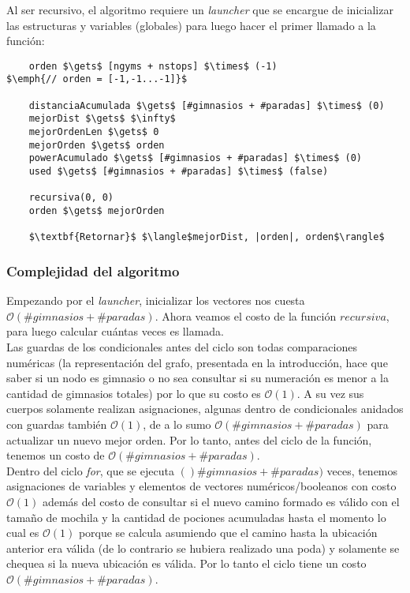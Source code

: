     Al ser recursivo, el algoritmo requiere un \emph{launcher} que se encargue de inicializar las estructuras y variables (globales) para luego hacer el primer llamado a la función:

    \begin{lstlisting}
    orden $\gets$ [ngyms + nstops] $\times$ (-1)                $\emph{// orden = [-1,-1...-1]}$

    distanciaAcumulada $\gets$ [#gimnasios + #paradas] $\times$ (0)
    mejorDist $\gets$ $\infty$
    mejorOrdenLen $\gets$ 0
    mejorOrden $\gets$ orden
    powerAcumulado $\gets$ [#gimnasios + #paradas] $\times$ (0)
    used $\gets$ [#gimnasios + #paradas] $\times$ (false)

    recursiva(0, 0)
    orden $\gets$ mejorOrden

    $\textbf{Retornar}$ $\langle$mejorDist, |orden|, orden$\rangle$
    \end{lstlisting}

    \subsubsection{Complejidad del algoritmo}

    Empezando por el \emph{launcher}, inicializar los vectores nos cuesta $\mathcal{O}(\#gimnasios + \#paradas)$. Ahora veamos el costo de la función $recursiva$, para luego calcular cuántas veces es llamada.
    \\

    Las guardas de los condicionales antes del ciclo son todas comparaciones numéricas (la representación del grafo, presentada en la introducción, hace que saber si un nodo es gimnasio o no sea consultar si su numeración es menor a la cantidad de gimnasios totales) por lo que su costo es $\mathcal{O}(1)$. A su vez sus cuerpos solamente realizan asignaciones, algunas dentro de condicionales anidados con guardas también $\mathcal{O}(1)$, de a lo sumo $\mathcal{O}(\#gimnasios + \#paradas)$ para actualizar un nuevo mejor orden. Por lo tanto, antes del ciclo de la función, tenemos un costo de $\mathcal{O}(\#gimnasios + \#paradas)$.
    \\

    Dentro del ciclo \emph{for}, que se ejecuta $()\#gimnasios + \#paradas)$ veces, tenemos asignaciones de variables y elementos de vectores numéricos/booleanos con costo $\mathcal{O}(1)$ además del costo de consultar si el nuevo camino formado es válido con el tamaño de mochila y la cantidad de pociones acumuladas hasta el momento lo cual es $\mathcal{O}(1)$ porque se calcula asumiendo que el camino hasta la ubicación anterior era válida (de lo contrario se hubiera realizado una poda) y solamente se chequea si la nueva ubicación es válida. Por lo tanto el ciclo tiene un costo $\mathcal{O}(\#gimnasios + \#paradas)$.
    \\

